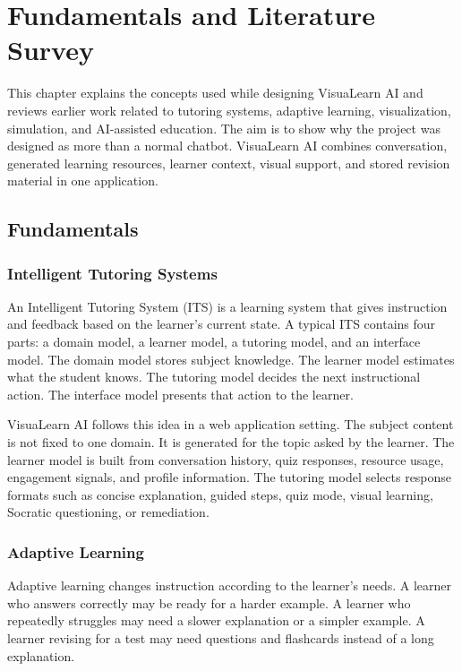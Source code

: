 \chapter{Fundamentals and Literature Survey}

This chapter explains the concepts used while designing VisuaLearn AI and reviews earlier work related to tutoring systems, adaptive learning, visualization, simulation, and AI-assisted education. The aim is to show why the project was designed as more than a normal chatbot. VisuaLearn AI combines conversation, generated learning resources, learner context, visual support, and stored revision material in one application.

\section[Fundamentals]{\textbf{Fundamentals}}

\subsection[Intelligent Tutoring Systems]{\textbf{Intelligent Tutoring Systems}}

An Intelligent Tutoring System (ITS) is a learning system that gives instruction and feedback based on the learner's current state. A typical ITS contains four parts: a domain model, a learner model, a tutoring model, and an interface model. The domain model stores subject knowledge. The learner model estimates what the student knows. The tutoring model decides the next instructional action. The interface model presents that action to the learner.

VisuaLearn AI follows this idea in a web application setting. The subject content is not fixed to one domain. It is generated for the topic asked by the learner. The learner model is built from conversation history, quiz responses, resource usage, engagement signals, and profile information. The tutoring model selects response formats such as concise explanation, guided steps, quiz mode, visual learning, Socratic questioning, or remediation.

\subsection[Adaptive Learning]{\textbf{Adaptive Learning}}

Adaptive learning changes instruction according to the learner's needs. A learner who answers correctly may be ready for a harder example. A learner who repeatedly struggles may need a slower explanation or a simpler example. A learner revising for a test may need questions and flashcards instead of a long explanation.

